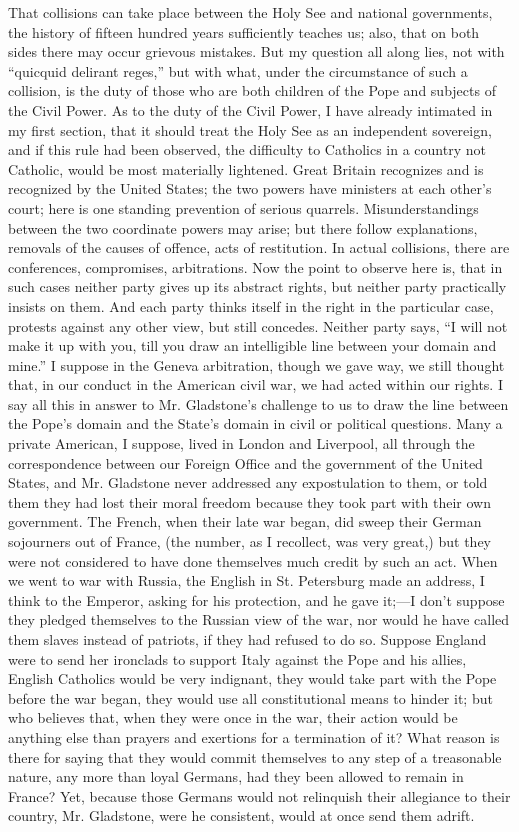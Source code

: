 That collisions can take place between the Holy See and national
governments, the history of fifteen hundred years sufficiently teaches
us; also, that on both sides there may occur grievous mistakes. But my
question all along lies, not with ``quicquid delirant reges,''
but with what, under the circumstance of such a collision, is the duty
of those who are both children of the Pope and subjects of the Civil
Power. As to the duty of the Civil Power, I have already intimated in my
first section, that it should treat the Holy See as an independent
sovereign, and if this rule had been observed, the difficulty to
Catholics in a country not Catholic, would be most materially lightened.
Great Britain recognizes and is recognized by the United States; the two
powers have ministers at each other's court; here is one standing
prevention of serious quarrels. Misunderstandings between the two
coordinate powers may arise; but there follow explanations, removals of
the causes of offence, acts of restitution. In actual collisions, there
are conferences, compromises, arbitrations. Now the point to observe
here is, that in such cases neither party gives up its abstract rights,
but neither party practically insists on them. And each party thinks
itself in the right in the particular case, protests against any other
view, but still concedes. Neither party says, ``I will not make it
up with you, till you draw an intelligible line between your domain and
mine.'' I suppose in the Geneva arbitration, though we gave
way, we still thought that, in our conduct in the American civil war, we
had acted within our rights. I say all this in answer to Mr. Gladstone's
challenge to us to draw the line between the Pope's domain and the
State's domain in civil or political questions. Many a private American,
I suppose, lived in London and Liverpool, all through the correspondence
between our Foreign Office and the government of the United States, and
Mr. Gladstone never addressed any expostulation to them, or told them
they had lost their moral freedom because they took part with their own
government. The French, when their late war began, did sweep their
German sojourners out of France, (the number, as I recollect, was very
great,) but they were not considered to have done themselves much credit
by such an act. When we went to war with Russia, the English in St.
Petersburg made an address, I think to the Emperor, asking for his
protection, and he gave it;—I don't suppose they pledged themselves to
the Russian view of the war, nor would he have called them slaves
instead of patriots, if they had refused to do so. Suppose England were
to send her ironclads to support Italy against the Pope and his allies,
English Catholics would be very indignant, they would take part with the
Pope before the war began, they would use all constitutional means to
hinder it; but who believes that, when they were once in the war, their
action would be anything else than prayers and exertions for a
termination of it? What reason is there for saying that they would
commit themselves to any step of a treasonable nature, any more than
loyal Germans, had they been allowed to remain in France? Yet,
because those Germans would not relinquish their allegiance to their
country, Mr. Gladstone, were he consistent, would at once send them
adrift.

